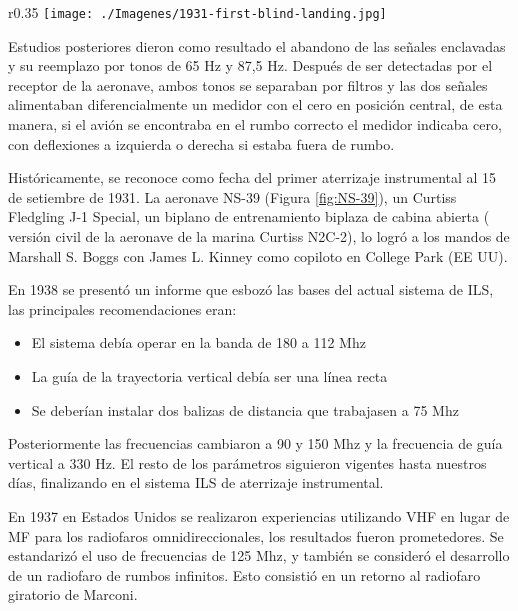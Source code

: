 
\begin{wrapfigure}{r}{0.35\textwidth} \centering
  \texttt{[image: ./Imagenes/1931-first-blind-landing.jpg]}\caption{Los pilotos James Kinney y Clarence Young con el NS-39 utilizado en las pruebas de vuelo a ciegas. College Park, 1933. \\ \emph{\tiny CPAM Photograph, Kear Collection}} \label{fig:NS-39}
\end{wrapfigure}

Estudios posteriores dieron como resultado el abandono de las se\~nales enclavadas y su reemplazo por tonos de 65 Hz y 87,5 Hz. Despu\'es de ser detectadas por el receptor de la aeronave, ambos tonos se separaban por filtros y las dos se\~nales alimentaban diferencialmente un medidor con el cero en posici\'on central, de esta manera, si el avi\'on se encontraba en el rumbo correcto el medidor indicaba cero, con deflexiones a izquierda o derecha si estaba fuera de rumbo.

Hist\'oricamente, se reconoce como fecha del primer aterrizaje instrumental al 15 de setiembre de 1931. La aeronave NS-39 (Figura \ref{fig:NS-39}),
un Curtiss Fledgling J-1 Special, un biplano de entrenamiento biplaza de cabina abierta ( versi\'on  civil de la aeronave de la marina Curtiss N2C-2),
 lo logr\'o a los mandos de Marshall S. Boggs con James L. Kinney como copiloto en College Park (EE UU).


En 1938 se present\'o un informe que esboz\'o las bases del actual sistema de ILS, las principales recomendaciones eran:

\begin{itemize}
\item El sistema deb\'ia operar en la banda de 180 a 112 Mhz

\item La gu\'ia de la trayectoria vertical deb\'ia ser una l\'inea recta

\item Se deber\'ian instalar dos balizas de distancia que trabajasen a 75 Mhz
\end{itemize}

Posteriormente las frecuencias cambiaron a 90 y 150 Mhz y la frecuencia de gu\'ia vertical a 330 Hz. El resto de los par\'ametros siguieron vigentes hasta nuestros d\'ias, finalizando en el sistema ILS de aterrizaje instrumental.

En 1937 en Estados Unidos se realizaron experiencias utilizando VHF en lugar de MF para los radiofaros omnidireccionales, los resultados fueron prometedores. Se estandariz\'o el uso de frecuencias de 125 Mhz, y tambi\'en se consider\'o el desarrollo de un radiofaro de rumbos infinitos. Esto consisti\'o en un retorno al radiofaro giratorio de Marconi.

